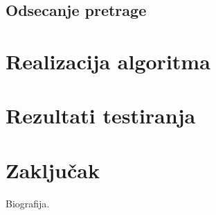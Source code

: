 \documentclass[12pt,oneside]{memoir}
\theoremstyle{definition}
\begin{document}
 \section{Odsecanje pretrage}

\chapter{Realizacija algoritma}

\chapter{Rezultati testiranja}

\chapter{Zaključak}

\literatura

\backmatter

\begin{biografija}
	Biografija.
\end{biografija}
\end{document}
